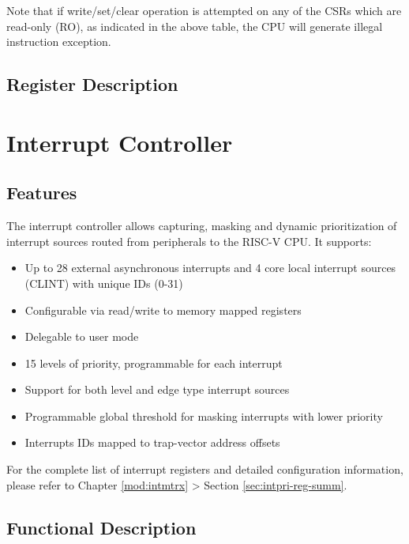 \documentclass[main\_\_EN.tex]{subfiles}
\begin{document}
Note that if write/set/clear operation is attempted on any of the CSRs which are read-only (RO), as indicated in the above table, the CPU will generate illegal instruction exception.

\subsection{Register Description}





\clearpage
\section{Interrupt Controller}
\label{sec:riscvcpu-int-ctrl}

\subsection{Features}
\label{sec:riscvcpu-int-features}

The interrupt controller allows capturing, masking and dynamic prioritization of interrupt sources routed from peripherals to the RISC-V CPU. It supports:

\begin{itemize}
    \item Up to 28 external asynchronous interrupts and 4 core local interrupt sources (CLINT) with unique IDs (0-31)
    \item Configurable via read/write to memory mapped registers
    \item Delegable to user mode
    \item 15 levels of priority, programmable for each interrupt
    \item Support for both level and edge type interrupt sources
    \item Programmable global threshold for masking interrupts with lower priority
    \item Interrupts IDs mapped to trap-vector address offsets
\end{itemize}

For the complete list of interrupt registers and detailed configuration information, please refer to Chapter \ref{mod:intmtrx} \textit{} > Section \ref{sec:intpri-reg-summ}.

\subsection{Functional Description}
\label{sec:riscvcpu-int-func-descr}
\end{document}
